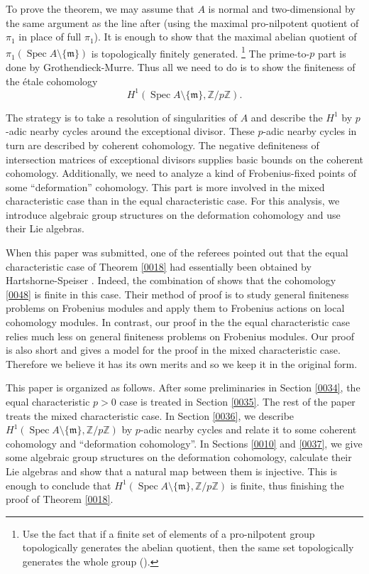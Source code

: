 \documentclass{amsart}
\theoremstyle{remark}
\numberwithin{equation}{section}
\newcommand{\Z}{\mathbb{Z}}
\newcommand{\ideal}[1]{\mathfrak{#1}}
\DeclareMathOperator{\Spec}{Spec}
\begin{document}
To prove the theorem, we may assume that $A$ is normal and two-dimensional
by the same argument as the line after
\cite[Expos\'e XIII, Conjecture 3.1]{Gro05}
(using the maximal pro-nilpotent quotient of $\pi_{1}$ in place of full $\pi_{1}$).
It is enough to show that
the maximal abelian quotient of $\pi_{1}(\Spec A \setminus \{\ideal{m}\})$ is
topologically finitely generated.%
\footnote{
	Use the fact that if a finite set of elements of a pro-nilpotent group topologically generates the abelian quotient,
	then the same set topologically generates the whole group
	(\cite[Section 5.8, Lemma 5.9]{MKS04}).
}
The prime-to-$p$ part is done by Grothendieck-Murre.
Thus all we need to do is to show the finiteness of the \'etale cohomology
	\begin{equation} \label{0048}
		H^{1}(\Spec A \setminus \{\ideal{m}\}, \Z / p \Z).
	\end{equation}

The strategy is to take a resolution of singularities of $A$ and describe the $H^{1}$
by $p$-adic nearby cycles around the exceptional divisor.
These $p$-adic nearby cycles in turn are described by coherent cohomology.
The negative definiteness of intersection matrices of exceptional divisors
supplies basic bounds on the coherent cohomology.
Additionally, we need to analyze a kind of Frobenius-fixed points of some ``deformation'' cohomology.
This part is more involved in the mixed characteristic case
than in the equal characteristic case.
For this analysis, we introduce algebraic group structures on the deformation cohomology
and use their Lie algebras.

When this paper was submitted,
one of the referees pointed out that
the equal characteristic case of Theorem \ref{0018} had essentially been
obtained by Hartshorne-Speiser \cite{HS77}.
Indeed, the combination of \cite[Corollary 5.5, Theorem 5.4 and Section 2, Remark (5)]{HS77}
shows that the cohomology \eqref{0048} is finite in this case.
Their method of proof is to study general finiteness problems on Frobenius modules
and apply them to Frobenius actions on local cohomology modules.
In contrast, our proof in the the equal characteristic case relies much less on
general finiteness problems on Frobenius modules.
Our proof is also short and gives a model for the proof in the mixed characteristic case.
Therefore we believe it has its own merits and so we keep it in the original form.

This paper is organized as follows.
After some preliminaries in Section \ref{0034},
the equal characteristic $p > 0$ case is treated in Section \ref{0035}.
The rest of the paper treats the mixed characteristic case.
In Section \ref{0036},
we describe $H^{1}(\Spec A \setminus \{\ideal{m}\}, \Z / p \Z)$
by $p$-adic nearby cycles and relate it to some coherent cohomology and ``deformation cohomology''.
In Sections \ref{0010} and \ref{0037},
we give some algebraic group structures on the deformation cohomology,
calculate their Lie algebras
and show that a natural map between them is injective.
This is enough to conclude that
$H^{1}(\Spec A \setminus \{\ideal{m}\}, \Z / p \Z)$ is finite,
thus finishing the proof of Theorem \ref{0018}.
\end{document}
